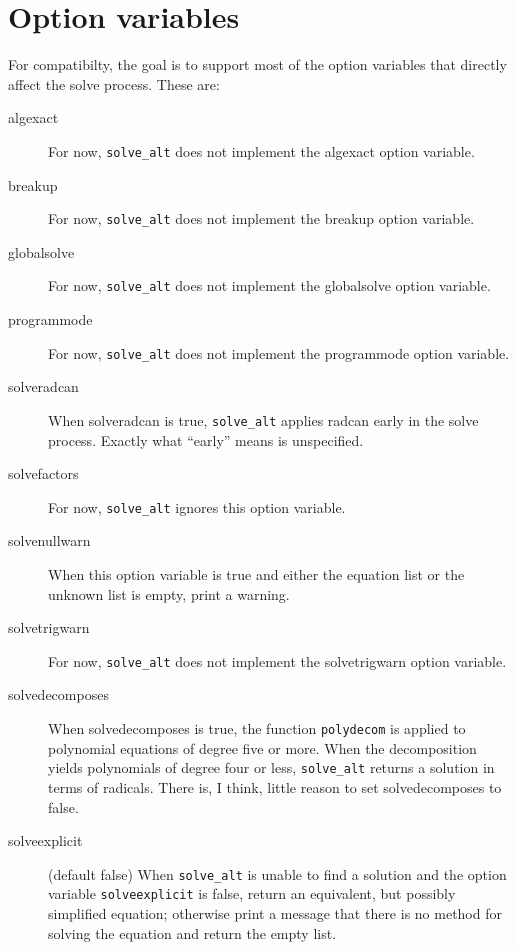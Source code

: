 \documentclass[]{scrartcl}
\newcommand{\altsolve}{\texttt{solve\_alt}}
\newcommand{\solveexplicit}{\texttt{solveexplicit}}
\begin{document}
\section{Option variables}

For compatibilty, the goal is to support most of the option variables that directly affect the solve process. These are:
\begin{description}

\item [algexact] For now, \altsolve\/ does not implement the algexact option variable.

\item [breakup] For now, \altsolve\/ does not implement the breakup option variable.

\item [globalsolve] For now, \altsolve\/ does not implement the globalsolve option variable.

\item [programmode] For now, \altsolve\/ does not implement the programmode option variable.

\item [solveradcan] When solveradcan is true, \altsolve\/ applies radcan early in the solve process.
      Exactly what ``early'' means is unspecified.

\item [solvefactors] For now, \altsolve\/ ignores this option variable.

\item [solvenullwarn] When this option variable is true and either the equation list or the unknown list is
empty, print a warning.

\item [solvetrigwarn] For now, \altsolve\/ does not implement the solvetrigwarn option variable.

\item [solvedecomposes] When solvedecomposes is true, the function \texttt{polydecom} is applied to
polynomial equations of degree five or more. When the decomposition yields polynomials of degree four
or less, \altsolve\/ returns a solution in terms of radicals. There is, I think, little reason to
set solvedecomposes to false.

\item [solveexplicit] (default false) When \altsolve\/  is unable to find a solution and the option variable \solveexplicit\/ is false, return an equivalent, but possibly simplified equation;  otherwise print a message that there is no method for solving the equation and return the empty list.


\end{description}
\end{document}
